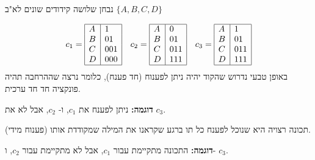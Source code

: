 נבחן שלושה קידודים שונים לא"ב 
$\{A, B, C, D\}$

$$
c_1 = 
\begin{array}{|l|l|}
\hline
A &  1
\\
B &  01
\\
C &  001
\\
D &  000
\\
\hline
\end{array}
%
\quad
c_2 = 
\begin{array}{|l|l|}
\hline
A &  0
\\
B &  01
\\
C &  011
\\
D &  111
\\
\hline
\end{array}
%
\quad
c_3 = 
\begin{array}{|l|l|}
\hline
A &  1
\\
B &  01
\\
C &  011
\\
D &  111
\\
\hline
\end{array}
$$
באופן טבעי נדרוש שהקוד יהיה ניתן לפענוח (חד פענח), 
כלומר נרצה שההרחבה תהיה פונקציה חד חד ערכית.

\textbf{דוגמה:}
ניתן לפענח את 
$c_1$,
ו-%
$c_2$,
אבל לא את
$c_3$.

תכונה רצויה היא שנוכל לפענח כל תו ברגע שקראנו את המילה שמקודדת אותו (פענוח מידי).

\textbf{דוגמה:}
התכונה מתקיימת עבור 
$c_1$,
אבל לא מתקיימת עבור 
$c_2$,
ו-%
$c_3$.
